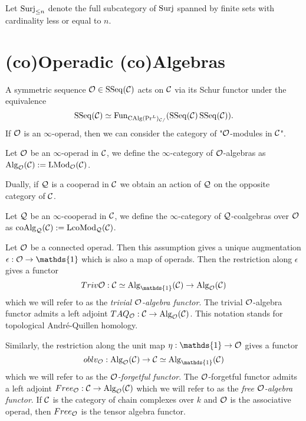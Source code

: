 Let $\operatorname{Surj}_{\leq n}$ denote the full subcategory of $\operatorname{Surj}$ spanned by finite sets with cardinality less or equal to $n$.
\section{(co)Operadic (co)Algebras}


A symmetric sequence ${\mathcal{O}}\in\operatorname{SSeq}({\mathcal{C}})$ acts on ${\mathcal{C}}$ via its Schur functor under the equivalence
\[
\operatorname{SSeq}({\mathcal{C}})
\simeq
\operatorname{Fun}_{\operatorname{CAlg}(\Pr^L)_{{\mathcal{C}}/}}(\operatorname{SSeq}({\mathcal{C}})\operatorname{SSeq}({\mathcal{C}})).
\]
If ${\mathcal{O}}$ is an $\infty$-operad, then we can consider the category of "${\mathcal{O}}$-modules in ${\mathcal{C}}$".
\begin{definition}
	\label{algebras over an operad}
	Let ${\mathcal{O}}$ be an $\infty$-operad in ${\mathcal{C}}$, we define the $\infty$-category of ${\mathcal{O}}$-algebras as $\operatorname{Alg}_{{\mathcal{O}}}({\mathcal{C}}):= \operatorname{LMod}_{{\mathcal{O}}}({\mathcal{C}})$.
\end{definition}

Dually, if ${\mathcal{Q}}$ is a cooperad in ${\mathcal{C}}$ we obtain an action of ${\mathcal{Q}}$ on the opposite category of ${\mathcal{C}}$. 
\begin{definition}
\label{coalgebras over a cooperad}
	Let ${\mathcal{Q}}$ be an $\infty$-cooperad in ${\mathcal{C}}$, we define the $\infty$-category of ${\mathcal{Q}}$-coalgebras over ${\mathcal{O}}$ as $\operatorname{coAlg}_{{\mathcal{Q}}}({\mathcal{C}}):= \operatorname{LcoMod}_{{\mathcal{Q}}}({\mathcal{C}})$.
\end{definition}


Let ${\mathcal{O}}$ be a connected operad. 
Then this assumption gives a unique augmentation $\epsilon:\CO\rightarrow \mathds{1}$ which is also a map of operads. 
Then the restriction along $\epsilon$ gives a functor 
$$
\trivial{\CO}: \CC\simeq\Alg_{\mathds{1}}(\CC)\rightarrow \Alg_{\CO}(\CC)
$$
which we will refer to as the \textit{trivial ${\mathcal{O}}$-algebra functor}.
The trivial ${\mathcal{O}}$-algebra functor admits a left adjoint $TAQ_{{\mathcal{O}}}:{\mathcal{C}}\rightarrow \operatorname{Alg}_{{\mathcal{O}}}({\mathcal{C}})$. This notation stands for topological Andr\'e-Quillen homology.

Similarly, the restriction along the unit map $\eta:\mathds{1}\rightarrow \CO$ gives a functor
$$
\oblv_{\CO}: \Alg_{\CO}(\CC)
\rightarrow 
\CC\simeq\Alg_{\mathds{1}}(\CC)$$
which we will refer to as the \textit{${\mathcal{O}}$-forgetful functor}.
The ${\mathcal{O}}$-forgetful functor admits a left adjoint $Free_{{\mathcal{O}}}:{\mathcal{C}}\rightarrow \operatorname{Alg}_{{\mathcal{O}}}({\mathcal{C}})$ which we will refer to as the \textit{free ${\mathcal{O}}$-algebra functor}. If ${\mathcal{C}}$ is the category of chain complexes over $k$ and ${\mathcal{O}}$ is the associative operad, then $Free_{{\mathcal{O}}}$ is the tensor algebra functor. 


